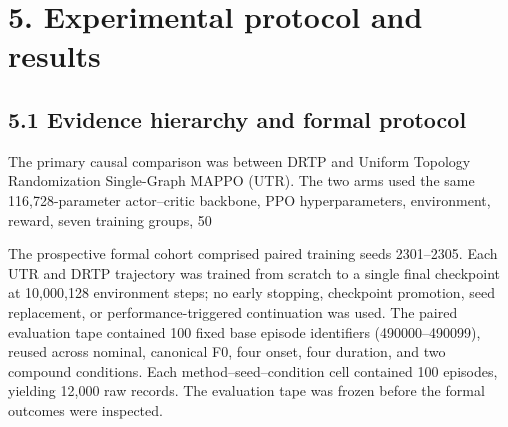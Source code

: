 \section{5. Experimental protocol and results}

\subsection{5.1 Evidence hierarchy and formal protocol}

The primary causal comparison was between DRTP and Uniform Topology Randomization Single-Graph MAPPO (UTR). The two arms used the same 116,728-parameter actor--critic backbone, PPO hyperparameters, environment, reward, seven training groups, 50%

The prospective formal cohort comprised paired training seeds 2301--2305. Each UTR and DRTP trajectory was trained from scratch to a single final checkpoint at 10,000,128 environment steps; no early stopping, checkpoint promotion, seed replacement, or performance-triggered continuation was used. The paired evaluation tape contained 100 fixed base episode identifiers (490000--490099), reused across nominal, canonical F0, four onset, four duration, and two compound conditions. Each method--seed--condition cell contained 100 episodes, yielding 12,000 raw records. The evaluation tape was frozen before the formal outcomes were inspected.

